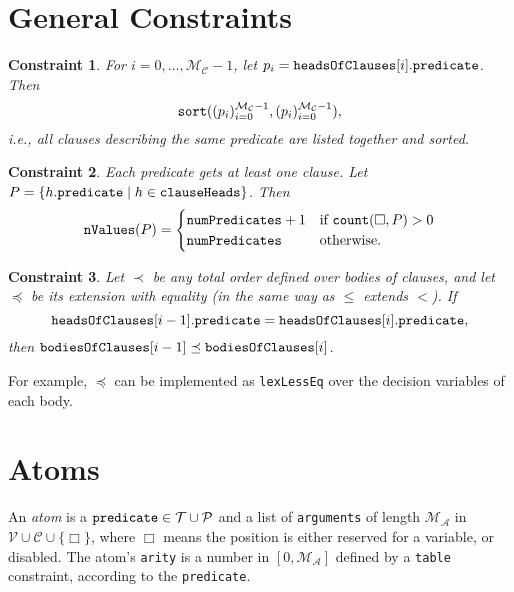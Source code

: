 \documentclass[runningheads]{llncs}
\newtheorem{constraint}{Constraint}
\newcommand{\variable}[1]{\texttt{\textup{#1}}}
\newcommand{\predicates}{\mathcal{P}}
\newcommand{\variables}{\mathcal{V}}
\newcommand{\constants}{\mathcal{C}}
\newcommand{\tokens}{\mathcal{T}}
\newcommand{\maxArity}{\mathcal{M}_{\mathcal{A}}}
\newcommand{\maxNumClauses}{\mathcal{M}_{\mathcal{C}}}
\begin{document}
\section{General Constraints}

\begin{constraint}
  For $i = 0, \dots, \maxNumClauses - 1$, let $p_i =
  \variable{headsOfClauses}[i].\variable{predicate}$. Then
  \[
    \variable{sort}((p_i)_{i=0}^{\maxNumClauses - 1}, (p_i)_{i=0}^{\maxNumClauses
      - 1}),
  \]
  i.e., all clauses describing the same predicate are listed together and
  sorted.
\end{constraint}

\begin{constraint}
  Each predicate gets at least one clause. Let $P = \{ h.\variable{predicate}
  \mid h \in \variable{clauseHeads} \}$. Then
  \[
    \variable{nValues}(P) =
    \begin{cases}
      \variable{numPredicates} + 1 & \text{if } \variable{count}(\Box, P) > 0 \\
      \variable{numPredicates} & \text{otherwise.}
    \end{cases}
  \]
\end{constraint}

\begin{constraint}
  Let $\prec$ be any total order defined over bodies of clauses, and let
  $\preceq$ be its extension with equality (in the same way as $\le$ extends
  $<$). If
  \[
    \variable{headsOfClauses}[i-1].\variable{predicate} =
    \variable{headsOfClauses}[i].\variable{predicate},
  \]
  then $\variable{bodiesOfClauses}[i-1] \preceq \variable{bodiesOfClauses}[i]$.
\end{constraint}
For example, $\preceq$ can be implemented as \variable{lexLessEq} over the
decision variables of each body.

\section{Atoms}

\begin{definition} \label{def:atom}
  An \emph{atom} is a $\variable{predicate} \in \tokens{} \cup \predicates{}$ and a
  list of \variable{arguments} of length $\maxArity{}$ in $\variables{} \cup
  \constants{} \cup \{ \Box \}$, where $\Box$ means the position is either
  reserved for a variable, or disabled. The atom's \variable{arity} is a number
  in $[0, \maxArity{}]$ defined by a \variable{table} constraint,
  according to the \variable{predicate}.
\end{definition}
\end{document}
